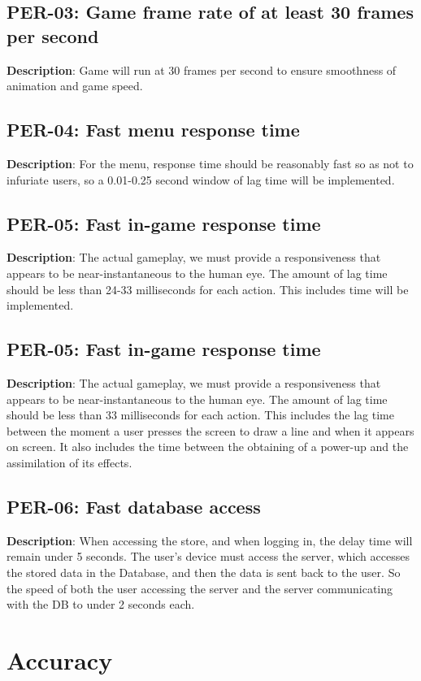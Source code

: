 \subsection{PER-03: Game frame rate of at least 30 frames per second}
\textbf{Description}: Game will run at 30 frames per second to ensure smoothness
of animation and game speed.

\subsection{PER-04: Fast menu response time}
\textbf{Description}: For the menu, response time should be reasonably fast
so as not to infuriate users, so a 0.01-0.25 second window of lag
time will be implemented.

\subsection{PER-05: Fast in-game response time}
\textbf{Description}: The actual gameplay, we must provide a responsiveness
that appears to be near-instantaneous to the human eye. The amount of lag time
should be less than 24-33 milliseconds for each action. This includes
time will be implemented.

\subsection{PER-05: Fast in-game response time}
\textbf{Description}: The actual gameplay, we must provide a responsiveness
that appears to be near-instantaneous to the human eye. The amount of lag time
should be less than 33 milliseconds for each action. This includes
the lag time between the moment a user presses the screen to draw
a line and when it appears on screen. It also includes the time between
the obtaining of a power-up and the assimilation of its effects.

\subsection{PER-06: Fast database access}
\textbf{Description}: When accessing the store, and when logging in, the delay
time will remain under 5 seconds. The user\textquoteright{}s device
must access the server, which accesses the stored data in the Database,
and then the data is sent back to the user. So the speed of both the
user accessing the server and the server communicating with the DB
to under 2 seconds each.

\section{Accuracy}

